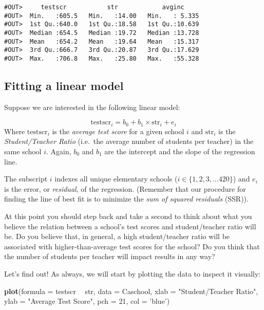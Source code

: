 \documentclass[]{book}
\newenvironment{Shaded}{\begin{snugshade}}{\end{snugshade}}
\newcommand{\KeywordTok}[1]{\textcolor[rgb]{0.13,0.29,0.53}{\textbf{#1}}}
\newcommand{\DataTypeTok}[1]{\textcolor[rgb]{0.13,0.29,0.53}{#1}}
\newcommand{\DecValTok}[1]{\textcolor[rgb]{0.00,0.00,0.81}{#1}}
\newcommand{\StringTok}[1]{\textcolor[rgb]{0.31,0.60,0.02}{#1}}
\newcommand{\OperatorTok}[1]{\textcolor[rgb]{0.81,0.36,0.00}{\textbf{#1}}}
\newcommand{\NormalTok}[1]{#1}
\begin{document}
\begin{verbatim}
#OUT>     testscr           str            avginc      
#OUT>  Min.   :605.5   Min.   :14.00   Min.   : 5.335  
#OUT>  1st Qu.:640.0   1st Qu.:18.58   1st Qu.:10.639  
#OUT>  Median :654.5   Median :19.72   Median :13.728  
#OUT>  Mean   :654.2   Mean   :19.64   Mean   :15.317  
#OUT>  3rd Qu.:666.7   3rd Qu.:20.87   3rd Qu.:17.629  
#OUT>  Max.   :706.8   Max.   :25.80   Max.   :55.328
\end{verbatim}

\subsection{Fitting a linear model}\label{fitting-a-linear-model}

Suppose we are interested in the following linear model:

\[\text{testscr}_i = b_0 + b_1 \times \text{str}_i + e_i\] Where
\(\text{testscr}_i\) is the \emph{average test score} for a given school
\(i\) and \(\text{str}_i\) is the \emph{Student/Teacher Ratio} (i.e.~the
average number of students per teacher) in the same school \(i\). Again,
\(b_0\) and \(b_1\) are the intercept and the slope of the regression
line.

The subscript \(i\) indexes all unique elementary schools
(\(i \in \{1, 2, 3, \dots 420\}\)) and \(e_i\) is the error, or
\emph{residual}, of the regression. (Remember that our procedure for
finding the line of best fit is to minimize the \emph{sum of squared
residuals} (SSR)).

At this point you should step back and take a second to think about what
you believe the relation between a school's test scores and
student/teacher ratio will be. Do you believe that, in general, a high
student/teacher ratio will be associated with higher-than-average test
scores for the school? Do you think that the number of students per
teacher will impact results in any way?

Let's find out! As always, we will start by plotting the data to inspect
it visually:

\begin{Shaded}
\begin{Highlighting}[]
\KeywordTok{plot}\NormalTok{(}\DataTypeTok{formula =}\NormalTok{ testscr }\OperatorTok{~}\StringTok{ }\NormalTok{str,}
     \DataTypeTok{data =}\NormalTok{ Caschool,}
     \DataTypeTok{xlab =} \StringTok{"Student/Teacher Ratio"}\NormalTok{,}
     \DataTypeTok{ylab =} \StringTok{"Average Test Score"}\NormalTok{, }\DataTypeTok{pch =} \DecValTok{21}\NormalTok{, }\DataTypeTok{col =} \StringTok{'blue'}\NormalTok{)}
\end{Highlighting}
\end{Shaded}
\end{document}

